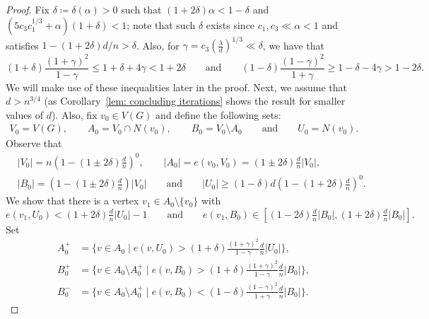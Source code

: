 \documentclass[reqno,a4paper]{amsart}
\theoremstyle{definition}
\begin{document}
\begin{proof}
Fix $\delta\coloneqq \delta(\alpha)>0$ such that $(1+2\delta)\alpha<1-\delta$ and $(5c_3c_1^{1/3}+\alpha)(1+\delta)<1$; note that such $\delta$ exists since $c_1,c_3\ll \alpha < 1$ and satisfies $1-(1+2\delta)d/n>\delta$.
Also, for $\gamma=c_3\left(\frac{\lambda}{d}\right)^{1/3}\ll \delta$, we have that
\begin{equation}\label{eq:bds}
(1+\delta)\frac{(1+\gamma)^2}{1-\gamma} \le 1+\delta+4\gamma < 1+2\delta\qquad \text{and}\qquad (1-\delta)\frac{(1-\gamma)^2}{1+\gamma} \ge 1-\delta-4\gamma > 1-2\delta.
\end{equation}
We will make use of these inequalities later in the proof.
Next, we assume that $d>n^{3/4}$ (as Corollary~\ref{lem: concluding iterations} shows the result for smaller values of $d$). Also, fix $v_0 \in V(G)$ 
and define the following sets:
\begin{align*}
    V_0=V(G),\qquad  A_0=V_0\cap N(v_0),\qquad  B_0=V_0\setminus A_0 \qquad  \text{and} \qquad  U_0=N(v_0).
\end{align*}
Observe that 
\begin{equation}\label{eq: sizes_0}
\begin{split}
    &|V_0|=n \left(1-\left(1\pm 2\delta\right)\frac{d}{n}\right)^0,\qquad  |A_0|=e(v_0,V_0) =\left(1\pm 2\delta\right)\frac{d}{n}|V_0|,\\
    &|B_0|=\left(1-\left(1\pm 2\delta\right)\frac{d}{n}\right)|V_0| \qquad  \text{and} \qquad  |U_0|\ge (1-\delta)d\left(1-\left(1+ 2\delta\right)\frac{d}{n}\right)^0.
\end{split}
\end{equation}
We show that there is a vertex $v_1\in A_0\setminus\{v_0\}$ with 
\begin{equation}\label{eq:propsv1}
e(v_1,U_0)<\left(1+ 2\delta\right)\tfrac{d}{n}|U_0|-1 \qquad \text{and}\qquad e(v_1,B_0)\in [(1- 2\delta)\tfrac{d}{n}|B_0|,(1+2\delta)\tfrac{d}{n}|B_0|]. 
\end{equation}
Set 
\begin{align*}
A^+_0&=\big\{v\in A_0\mid e(v,U_0)>(1+\delta)\tfrac{(1+\gamma)^2}{1-\gamma}\tfrac{d}{n}|U_0|\big\},\\
B_0^+ &= \big\{v\in A_0\setminus A_0^+\mid e(v,B_0)>(1+\delta)\tfrac{(1+\gamma)^2}{1-\gamma}\tfrac{d}{n}|B_0|\big\},\\
B_0^- &= \big\{v\in A_0\setminus A_0^+\mid e(v,B_0)<(1-\delta)\tfrac{(1-\gamma)^2}{1+\gamma}\tfrac{d}{n}|B_0|\big\}.  
\end{align*}


\end{proof}
\end{document}
